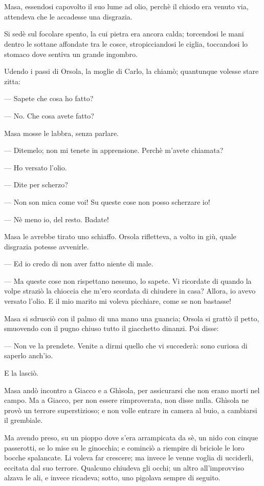 \chapter{}

Masa, essendosi capovolto il suo lume ad olio, perchè il chiodo era venuto via, attendeva che le accadesse una disgrazia.

Si sedè sul focolare spento, la cui pietra era ancora calda; torcendosi le mani dentro le sottane affondate tra le cosce, stropicciandosi le ciglia, toccandosi lo stomaco dove sentiva un grande ingombro.

Udendo i passi di Orsola, la moglie di Carlo, la chiamò; quantunque volesse stare zitta:

— Sapete che cosa ho fatto?

— No. Che cosa avete fatto?

Masa mosse le labbra, senza parlare.

— Ditemelo; non mi tenete in apprensione. Perchè m’avete chiamata?

— Ho versato l’olio.

— Dite per scherzo?

— Non son mica come voi! Su queste cose non posso scherzare io!

— Nè meno io, del resto. Badate!

Masa le avrebbe tirato uno schiaffo. Orsola rifletteva, a volto in giù, quale disgrazia potesse avvenirle.

— Ed io credo di non aver fatto niente di male.

— Ma queste cose non rispettano nessuno, lo sapete. Vi ricordate di quando la volpe straziò la chioccia che m’ero scordata di chiudere in casa? Allora, io avevo versato l’olio. E il mio marito mi voleva picchiare, come se non bastasse!

Masa si sdrusciò con il palmo di una mano una guancia; Orsola si grattò il petto, smuovendo con il pugno chiuso tutto il giacchetto dinanzi. Poi disse:

— Non ve la prendete. Venite a dirmi quello che vi succederà: sono curiosa di saperlo anch’io.

E la lasciò.

Masa andò incontro a Giacco e a Ghìsola, per assicurarsi che non erano morti nel campo. Ma a Giacco, per non essere rimproverata, non disse nulla. Ghìsola ne provò un terrore superstizioso; e non volle entrare in camera al buio, a cambiarsi il grembiale.

Ma avendo preso, su un pioppo dove s’era arrampicata da sè, un nido con cinque passerotti, se lo mise su le ginocchia; e cominciò a riempire di briciole le loro bocche spalancate. Li voleva far crescere; ma invece le venne voglia di ucciderli, eccitata dal suo terrore. Qualcuno chiudeva gli occhi; un altro all’improvviso alzava le ali, e invece ricadeva; sotto, uno pigolava sempre di seguito.

